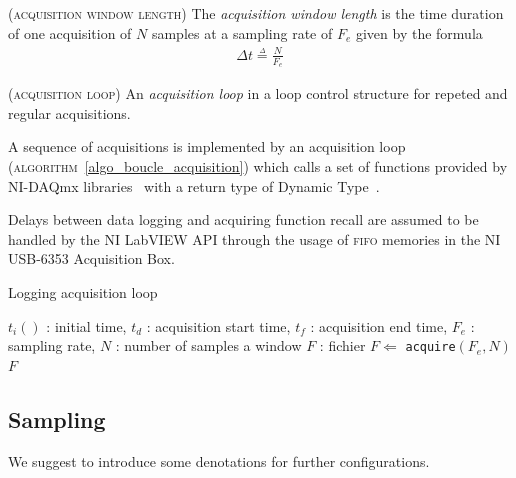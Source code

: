 \documentclass[twocolumn,pre,floats,aps,amsmath,amssymb]{revtex4}
\newenvironment{definition}[1][D\'efinition.]{\begin{trivlist}
\item[\hskip \labelsep {\bfseries #1}]}{\end{trivlist}}
\newenvironment{remark}[1][Remarque.]{\begin{trivlist}
\item[\hskip \labelsep {\bfseries #1}]}{\end{trivlist}}
\begin{document}
\begin{definition}
  (\textsc{acquisition window length})
  The \textit{acquisition window length} is the time duration of one acquisition of $N$ samples at a sampling rate of $F_e$ given by the formula
  \begin{eqnarray*}
    \Delta t \overset{\underset{\Delta}{}}{=} \frac{N}{F_e}
  \end{eqnarray*}
\end{definition}

\begin{definition}
  (\textsc{acquisition loop})
  An \textit{acquisition loop} in a loop control structure for repeted and regular acquisitions.
\end{definition}

A sequence of acquisitions is implemented by an acquisition loop (\textsc{algorithm}~\ref{algo_boucle_acquisition}) which calls a set of functions provided by NI-DAQmx libraries~\cite{NI_acquisition_design_ref} with a return type of Dynamic Type~\cite{NI_Dynamic_data}.


\begin{remark}
  Delays between data logging and acquiring function recall are assumed to be handled by the NI LabVIEW API through the usage of \textsc{fifo} memories in the NI USB-6353 Acquisition Box\cite{NI_6353_datasheet}.
\end{remark}

\begin{algorithm}[h]
\caption{Logging acquisition loop}
\label{algo_boucle_acquisition}
\begin{algorithmic}[1]
  \REQUIRE $t_i()$ : initial time, $t_d$ : acquisition start time, $t_f$ : acquisition end time, $F_e$ : sampling rate, $N$ : number of samples a window
  \STATE $F$ : fichier
  \STATE $F \Leftarrow$ \texttt{acquire}$(F_e, N)$
  \ENDWHILE
  \RETURN $F$
\end{algorithmic}
\end{algorithm}

\subsection{Sampling}
We suggest to introduce some denotations for further configurations.
\end{document}
